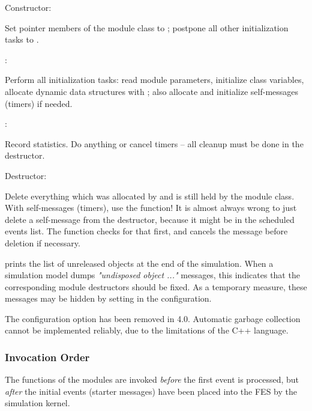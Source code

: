 \begin{description}

\item Constructor:

Set pointer members of the module class to ; postpone all other
initialization tasks to .

\item {}:

Perform all initialization tasks: read module parameters, initialize
class variables, allocate dynamic data structures with ;
also allocate and initialize self-messages (timers) if needed.

\item {}:

Record statistics. Do   anything or cancel timers --
all cleanup must be done in the destructor.

\item Destructor:

Delete everything which was allocated by  and is still held
by the module class. With self-messages (timers), use the
 function! It is almost always wrong
to just delete a self-message from the destructor, because it might be
in the scheduled events list. The  function
checks for that first, and cancels the message before deletion if necessary.

\end{description}

{\opp} prints the list of unreleased objects at the end of the simulation.
When a simulation model dumps \textit{"undisposed object ..."} messages, this indicates
that the corresponding module destructors should be fixed. As a temporary measure, these
messages may be hidden by setting  in the
configuration.

\begin{note}
    The  configuration option has been removed in {\opp} 4.0.
    Automatic garbage collection cannot be implemented reliably, due to the
    limitations of the C++ language.
\end{note}


\subsubsection{Invocation Order}

The  functions of the modules are invoked \textit{before}
the first event is processed, but \textit{after} the initial events (starter
messages) have been placed into the FES by
the simulation kernel.


